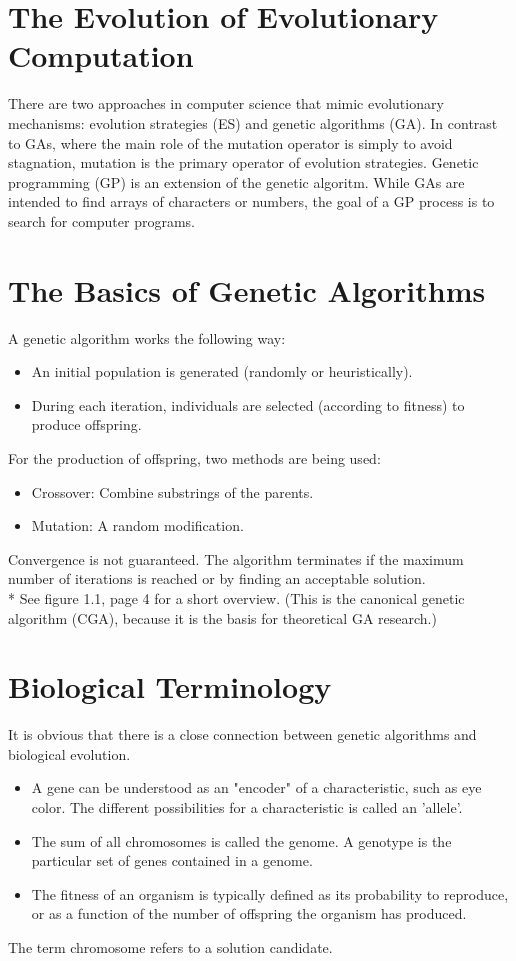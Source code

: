 \documentclass[12pt]{book}
\begin{document}
\section{The Evolution of Evolutionary Computation}
There are two approaches in computer science that mimic evolutionary mechanisms: evolution strategies (ES) and genetic algorithms (GA). In contrast to GAs, where the main role of the mutation operator is simply to avoid stagnation, mutation is the primary operator of evolution strategies. Genetic programming (GP) is an extension of the genetic algoritm. While GAs are intended to find arrays of characters or numbers, the goal of a GP process is to search for computer programs.
\section{The Basics of Genetic Algorithms}
A genetic algorithm works the following way:
\begin{itemize}
\item An initial population is generated (randomly or heuristically).
\item During each iteration, individuals are selected (according to fitness) to produce offspring.
\end{itemize}
For the production of offspring, two methods are being used:
\begin{itemize}
\item Crossover: Combine substrings of the parents.
\item Mutation: A random modification.
\end{itemize}
Convergence is not guaranteed. The algorithm terminates if the maximum number of iterations is reached or by finding an acceptable solution.\\*
See figure 1.1, page 4 for a short overview. (This is the canonical genetic algorithm (CGA), because it is the basis for theoretical GA research.)
\section{Biological Terminology}
It is obvious that there is a close connection between genetic algorithms and biological evolution.
\begin{itemize}
\item A gene can be understood as an "encoder" of a characteristic, such as eye color.  The different possibilities for a characteristic is called an 'allele'.
\item The sum of all chromosomes is called the genome. A genotype is the particular set of genes contained in a genome.
\item The fitness of an organism is typically defined as its probability to reproduce, or as a function of the number of offspring the organism has produced.
\end{itemize}
The term chromosome refers to a solution candidate.
\end{document}
